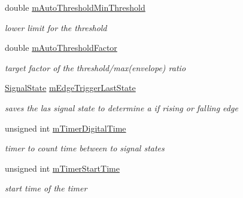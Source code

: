 \begin{DoxyCompactItemize}
\mbox{\label{classMorseDecode_a0114f518eb79cc9d0bf92c62ba7745e5}} 
double \hyperlink{classMorseDecode_a0114f518eb79cc9d0bf92c62ba7745e5}{m\+Auto\+Threshold\+Min\+Threshold}
\begin{DoxyCompactList}\small\item\em lower limit for the threshold \end{DoxyCompactList}\item 
\mbox{\label{classMorseDecode_a5554fd16e578137d3766b6d8760a8f44}} 
double \hyperlink{classMorseDecode_a5554fd16e578137d3766b6d8760a8f44}{m\+Auto\+Threshold\+Factor}
\begin{DoxyCompactList}\small\item\em target factor of the threshold/max(envelope) ratio \end{DoxyCompactList}\item 
\mbox{\label{classMorseDecode_af36a0cb450ba6d7080889501dae9359d}} 
\hyperlink{classMorseDecode_abe155104534fe272d25da5eb19b317bd}{Signal\+State} \hyperlink{classMorseDecode_af36a0cb450ba6d7080889501dae9359d}{m\+Edge\+Trigger\+Last\+State}
\begin{DoxyCompactList}\small\item\em saves the las signal state to determine a if rising or falling edge \end{DoxyCompactList}\item 
\mbox{\label{classMorseDecode_af35e1f28d8f1a5bb8bbb508d74d85cf0}} 
unsigned int \hyperlink{classMorseDecode_af35e1f28d8f1a5bb8bbb508d74d85cf0}{m\+Timer\+Digital\+Time}
\begin{DoxyCompactList}\small\item\em timer to count time between to signal states \end{DoxyCompactList}\item 
\mbox{\label{classMorseDecode_a73d327af4ea9514602ea336afa8a6e71}} 
unsigned int \hyperlink{classMorseDecode_a73d327af4ea9514602ea336afa8a6e71}{m\+Timer\+Start\+Time}
\begin{DoxyCompactList}\small\item\em start time of the timer \end{DoxyCompactList}\item 
\mbox{\label{classMorseDecode_a55c259a7cffa248023b531e0b9be5fe9}} 

\end{DoxyCompactItemize}
